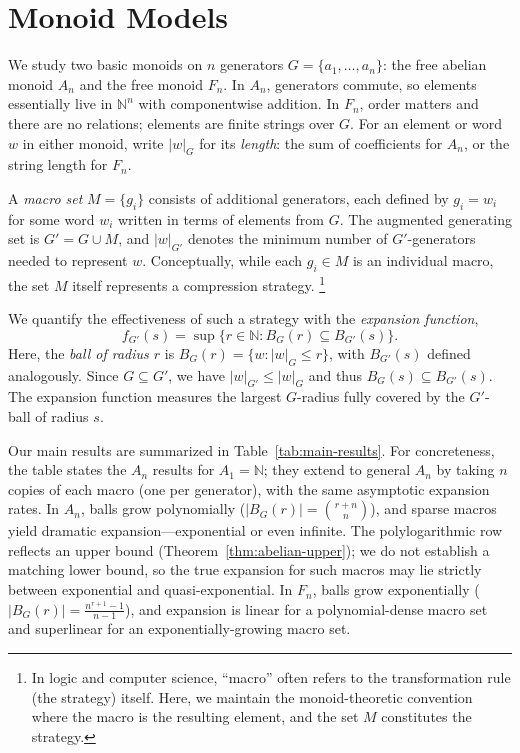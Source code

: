 \documentclass[12pt]{amsart}
\newcommand{\N}{\mathbb{N}}
\theoremstyle{definition}
\theoremstyle{remark}
\begin{document}
\section{Monoid Models}
\label{monoid_models_section}

We study two basic monoids on $n$ generators $G = \{a_1, \ldots, a_n\}$: the free abelian monoid $A_n$ and the free monoid $F_n$.
In $A_n$, generators commute, so elements essentially live in $\N^n$ with componentwise addition.
In $F_n$, order matters and there are no relations; elements are finite strings over $G$.
For an element or word $w$ in either monoid, write $|w|_G$ for its \emph{length}: the sum of coefficients for $A_n$, or the string length for $F_n$.

A \emph{macro set} $M = \{g_i\}$ consists of additional generators, each defined by $g_i = w_i$ for some word $w_i$ written in terms of elements from $G$.
The augmented generating set is $G' = G \cup M$, and $|w|_{G'}$ denotes the minimum number of $G'$-generators needed to represent $w$.
Conceptually, while each $g_i \in M$ is an individual macro, the set $M$ itself represents a compression strategy.
\footnote{In logic and computer science, ``macro'' often refers to the transformation rule (the strategy) itself.
Here, we maintain the monoid-theoretic convention where the macro is the resulting element, and the set $M$ constitutes the strategy.}

We quantify the effectiveness of such a strategy with the \emph{expansion function},
\[
f_{G'}(s) = \sup\{r \in \N : B_G(r) \subseteq B_{G'}(s)\}.
\]
Here, the \emph{ball of radius $r$} is $B_G(r) = \{w : |w|_G \leq r\}$, with $B_{G'}(s)$ defined analogously.
Since $G \subseteq G'$, we have $|w|_{G'} \leq |w|_G$ and thus $B_G(s) \subseteq B_{G'}(s)$.
The expansion function measures the largest $G$-radius fully covered by the $G'$-ball of radius $s$.

Our main results are summarized in Table~\ref{tab:main-results}.
For concreteness, the table states the $A_n$ results for $A_1 = \N$; they extend to general $A_n$ by taking $n$ copies of each macro (one per generator), with the same asymptotic expansion rates.
In $A_n$, balls grow polynomially ($|B_G(r)| = \binom{r+n}{n}$), and sparse macros yield dramatic expansion---exponential or even infinite.
The polylogarithmic row reflects an upper bound (Theorem~\ref{thm:abelian-upper}); we do not establish a matching lower bound, so the true expansion for such macros may lie strictly between exponential and quasi-exponential.
In $F_n$, balls grow exponentially ($|B_G(r)| = \frac{n^{r+1}-1}{n-1}$), and expansion is linear for a polynomial-dense macro set and superlinear for an exponentially-growing macro set.
\end{document}
